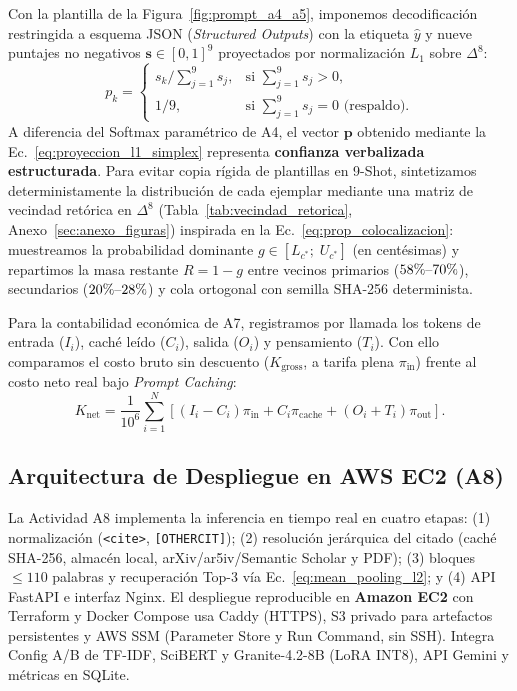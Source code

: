 \documentclass[conference]{IEEEtran}
\newcommand{\pct}{\mbox{\symbol{37}}}
\begin{document}
Con la plantilla de la Figura~\ref{fig:prompt_a4_a5}, imponemos decodificación restringida a esquema JSON (\textit{Structured Outputs}) con la etiqueta $\hat{y}$ y nueve puntajes no negativos $\mathbf{s} \in [0, 1]^9$ proyectados por normalización $L_1$ sobre $\Delta^8$:
\begin{equation}
\label{eq:proyeccion_l1_simplex}
p_k = \begin{cases}
s_k / \sum_{j=1}^{9} s_j, & \text{si } \sum_{j=1}^{9} s_j > 0, \\[3pt]
1 / 9, & \text{si } \sum_{j=1}^{9} s_j = 0 \text{ (respaldo)}.
\end{cases}
\end{equation}
A diferencia del Softmax paramétrico de A4, el vector $\mathbf{p}$ obtenido mediante la Ec.~\eqref{eq:proyeccion_l1_simplex} representa \textbf{confianza verbalizada estructurada}. Para evitar copia rígida de plantillas en 9-Shot, sintetizamos deterministamente la distribución de cada ejemplar mediante una matriz de vecindad retórica en $\Delta^8$ (Tabla~\ref{tab:vecindad_retorica}, Anexo~\ref{sec:anexo_figuras}) inspirada en la Ec.~\eqref{eq:prop_colocalizacion}: muestreamos la probabilidad dominante $g \in [L_{c^*};\; U_{c^*}]$ (en centésimas) y repartimos la masa restante $R = 1 - g$ entre vecinos primarios ($58\pct{}\text{--}70\pct{}$), secundarios ($20\pct{}\text{--}28\pct{}$) y cola ortogonal con semilla SHA-256 determinista.

Para la contabilidad económica de A7, registramos por llamada los tokens de entrada ($I_i$), caché leído ($C_i$), salida ($O_i$) y pensamiento ($T_i$). Con ello comparamos el costo bruto sin descuento ($K_{\text{gross}}$, a tarifa plena $\pi_{\text{in}}$) frente al costo neto real bajo \textit{Prompt Caching}:
\begin{equation*}
K_{\text{net}} = \frac{1}{10^6} \sum_{i=1}^{N} \left[ (I_i - C_i)\pi_{\text{in}} + C_i\pi_{\text{cache}} + (O_i + T_i)\pi_{\text{out}} \right].
\end{equation*}

\subsection{Arquitectura de Despliegue en AWS EC2 (A8)}

La Actividad A8 implementa la inferencia en tiempo real en cuatro etapas: (1) normalización (\texttt{<cite>}, \texttt{[OTHERCIT]}); (2) resolución jerárquica del citado (caché SHA-256, almacén local, arXiv/ar5iv/Semantic Scholar y PDF); (3) bloques $\le 110$ palabras y recuperación Top-3 vía Ec.~\eqref{eq:mean_pooling_l2}; y (4) API FastAPI e interfaz Nginx. El despliegue reproducible en \textbf{Amazon EC2} con Terraform y Docker Compose usa Caddy (HTTPS), S3 privado para artefactos persistentes y AWS SSM (Parameter Store y Run Command, sin SSH). Integra Config A/B de TF-IDF, SciBERT y Granite-4.2-8B (LoRA INT8), API Gemini y métricas en SQLite.
\end{document}
